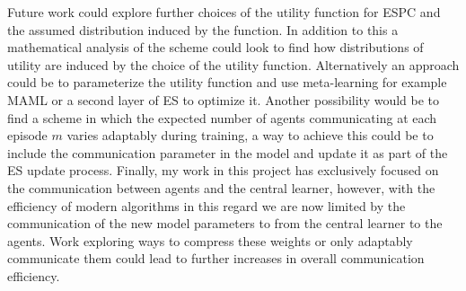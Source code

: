 Future work could explore further choices of the utility function for ESPC and the assumed distribution induced by the function. In addition to this a mathematical analysis of the scheme could look to find how distributions of utility are induced by the choice of the utility function. Alternatively an approach could be to parameterize the utility function and use meta-learning for example MAML \cite{MAML} or a second layer of ES to optimize it. Another possibility would be to find a scheme in which the expected number of agents communicating at each episode $m$ varies adaptably during training, a way to achieve this could be to include the communication parameter in the model and update it as part of the ES update process. Finally, my work in this project has exclusively focused on the communication between agents and the central learner, however, with the efficiency of modern algorithms in this regard we are now limited by the communication of the new model parameters to from the central learner to the agents. Work exploring ways to compress these weights or only adaptably communicate them could lead to further increases in overall communication efficiency.